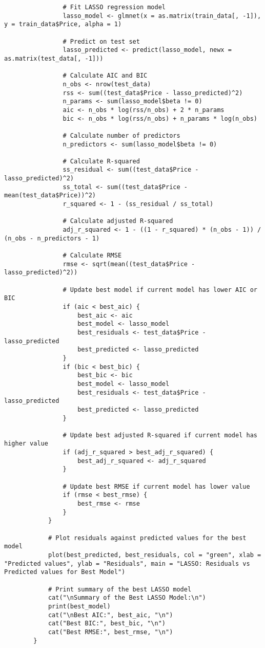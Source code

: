 \documentclass[12pt,doublespace]{article}
\begin{document}
\begin{lstlisting}
				# Fit LASSO regression model
				lasso_model <- glmnet(x = as.matrix(train_data[, -1]), y = train_data$Price, alpha = 1)
				
				# Predict on test set
				lasso_predicted <- predict(lasso_model, newx = as.matrix(test_data[, -1]))
				
				# Calculate AIC and BIC
				n_obs <- nrow(test_data)
				rss <- sum((test_data$Price - lasso_predicted)^2)
				n_params <- sum(lasso_model$beta != 0)
				aic <- n_obs * log(rss/n_obs) + 2 * n_params
				bic <- n_obs * log(rss/n_obs) + n_params * log(n_obs)
				
				# Calculate number of predictors
				n_predictors <- sum(lasso_model$beta != 0)
				
				# Calculate R-squared
				ss_residual <- sum((test_data$Price - lasso_predicted)^2)
				ss_total <- sum((test_data$Price - mean(test_data$Price))^2)
				r_squared <- 1 - (ss_residual / ss_total)
				
				# Calculate adjusted R-squared
				adj_r_squared <- 1 - ((1 - r_squared) * (n_obs - 1)) / (n_obs - n_predictors - 1)
				
				# Calculate RMSE
				rmse <- sqrt(mean((test_data$Price - lasso_predicted)^2))
				
				# Update best model if current model has lower AIC or BIC
				if (aic < best_aic) {
					best_aic <- aic
					best_model <- lasso_model
					best_residuals <- test_data$Price - lasso_predicted
					best_predicted <- lasso_predicted
				}
				if (bic < best_bic) {
					best_bic <- bic
					best_model <- lasso_model
					best_residuals <- test_data$Price - lasso_predicted
					best_predicted <- lasso_predicted
				}
				
				# Update best adjusted R-squared if current model has higher value
				if (adj_r_squared > best_adj_r_squared) {
					best_adj_r_squared <- adj_r_squared
				}
				
				# Update best RMSE if current model has lower value
				if (rmse < best_rmse) {
					best_rmse <- rmse
				}
			}
			
			# Plot residuals against predicted values for the best model
			plot(best_predicted, best_residuals, col = "green", xlab = "Predicted values", ylab = "Residuals", main = "LASSO: Residuals vs Predicted values for Best Model")
			
			# Print summary of the best LASSO model
			cat("\nSummary of the Best LASSO Model:\n")
			print(best_model)
			cat("\nBest AIC:", best_aic, "\n")
			cat("Best BIC:", best_bic, "\n")
			cat("Best RMSE:", best_rmse, "\n")
		}
		

\end{lstlisting}
\end{document}
